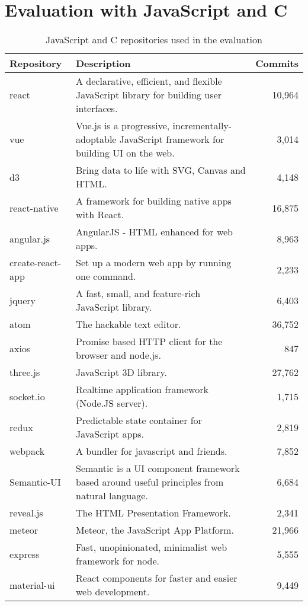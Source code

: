 
\section{Evaluation with JavaScript and C}
\label{sec:eval:js:c}

\begin{table*}[htbp]
\renewcommand{\arraystretch}{1.2}
\caption{JavaScript and C repositories used in the evaluation}
\label{TabJsCRepos}
\centering
\begin{tabular}{@{}lp{13cm}r@{}}
\toprule
Repository & Description & Commits\\
\midrule
react & A declarative, efficient, and flexible JavaScript library for building user interfaces. & 10,964 \\
vue & Vue.js is a progressive, incrementally-adoptable JavaScript framework for building UI on the web. & 3,014 \\
d3 & Bring data to life with SVG, Canvas and HTML. & 4,148 \\
react-native & A framework for building native apps with React. & 16,875 \\
angular.js & AngularJS - HTML enhanced for web apps. & 8,963 \\
create-react-app & Set up a modern web app by running one command. & 2,233 \\
jquery & A fast, small, and feature-rich JavaScript library. & 6,403 \\
atom & The hackable text editor. & 36,752 \\
axios & Promise based HTTP client for the browser and node.js. & 847 \\
three.js & JavaScript 3D library. & 27,762 \\
socket.io & Realtime application framework (Node.JS server). & 1,715 \\
redux & Predictable state container for JavaScript apps. & 2,819 \\
webpack & A bundler for javascript and friends. & 7,852 \\
Semantic-UI & Semantic is a UI component framework based around useful principles from natural language. & 6,684 \\
reveal.js & The HTML Presentation Framework. & 2,341 \\
meteor & Meteor, the JavaScript App Platform. & 21,966 \\
express & Fast, unopinionated, minimalist web framework for node. & 5,555 \\
material-ui & React components for faster and easier web development. & 9,449 \\

\end{tabular}
\end{table*}
